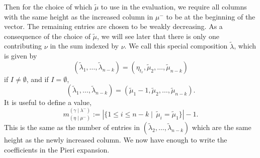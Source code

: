 \documentclass[11pt]{article}
\theoremstyle{definition}
\numberwithin{equation}{section}
\newcommand{\gammalambdamin}{{(\gamma \mid \lambda^-)}}
\newcommand{\etamu}{{(\eta \mid \mu^-)}}
\newcommand{\mutilde}{{\widetilde{\mu}}}
\newcommand{\lambdatilde}{{\widetilde{\lambda}}}
\newcommand{\mIone}{m_{\etamu}^{\gammalambdamin}}
\begin{document}
Then for the choice of which $\mutilde$ to use in the evaluation, we require all columns with the same height as the increased column in $\mu^-$ to be at the beginning of the vector. The remaining entries are chosen to be weakly decreasing. As a consequence of the choice of $\mutilde$, we will see later that there is only one contributing $\nu$ in the sum indexed by $\nu$. We call this special composition $\lambdatilde$, which is given by
\[(\lambdatilde_1,  \dotsc, \lambdatilde_{n-k}) = (\eta_{t_r}, \mutilde_2, \dotsc, \mutilde_{n-k}) \]
if $I\neq \emptyset$, and if $I = \emptyset$,
\[ (\lambdatilde_1, \dotsc, \lambdatilde_{n-k}) = (\mutilde_1-1, \mutilde_2, \dotsc, \mutilde_{n-k}).\]
It is useful to define a value,
 \[\mIone := |\{ 1\leq i \leq n-k \mid \, \mutilde_i = \mutilde_1  \}|-1. \]
This is the same as the number of entries in $(\lambdatilde_2,\dotsc, \lambdatilde_{n-k})$ which are the same height as the newly increased column. We now have enough to write the coefficients in the Pieri expansion.
\end{document}
